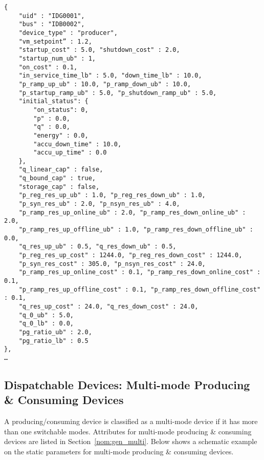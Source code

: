 \begin{verbatim}
{
    "uid" : "IDG0001",
    "bus" : "IDB0002",
    "device_type" : "producer",
    "vm_setpoint” : 1.2,
    "startup_cost" : 5.0, "shutdown_cost" : 2.0,
    "startup_num_ub" : 1,
    "on_cost" : 0.1,
    "in_service_time_lb" : 5.0, "down_time_lb" : 10.0,
    "p_ramp_up_ub" : 10.0, "p_ramp_down_ub" : 10.0, 
    "p_startup_ramp_ub" : 5.0, "p_shutdown_ramp_ub" : 5.0,
    "initial_status": {
        "on_status": 0,
        "p" : 0.0,
        "q" : 0.0,
        "energy" : 0.0,
        "accu_down_time" : 10.0,
        "accu_up_time" : 0.0
    },
    "q_linear_cap" : false, 
    "q_bound_cap" : true, 
    "storage_cap" : false,
    "p_reg_res_up_ub" : 1.0, "p_reg_res_down_ub" : 1.0,
    "p_syn_res_ub" : 2.0, "p_nsyn_res_ub" : 4.0, 
    "p_ramp_res_up_online_ub" : 2.0, "p_ramp_res_down_online_ub" : 2.0,
    "p_ramp_res_up_offline_ub" : 1.0, "p_ramp_res_down_offline_ub" : 0.0,
    "q_res_up_ub" : 0.5, "q_res_down_ub" : 0.5,
    "p_reg_res_up_cost" : 1244.0, "p_reg_res_down_cost" : 1244.0,
    "p_syn_res_cost" : 305.0, "p_nsyn_res_cost" : 24.0, 
    "p_ramp_res_up_online_cost" : 0.1, "p_ramp_res_down_online_cost" : 0.1,
    "p_ramp_res_up_offline_cost" : 0.1, "p_ramp_res_down_offline_cost" : 0.1,
    "q_res_up_cost" : 24.0, "q_res_down_cost" : 24.0,
    "q_0_ub" : 5.0,
    "q_0_lb" : 0.0,
    "pg_ratio_ub" : 2.0,
    "pg_ratio_lb" : 0.5    
},
…     
\end{verbatim}

\subsection{Dispatchable Devices: Multi-mode Producing \& Consuming Devices}
\label{sec:multi-generator}
A producing/consuming device is classified as a multi-mode device if it
has more than one switchable modes.
Attributes for multi-mode producing \& consuming devices are listed in Section~\ref{nom:gen_multi}.
Below shows a schematic example on the static parameters for multi-mode producing \& consuming devices.


